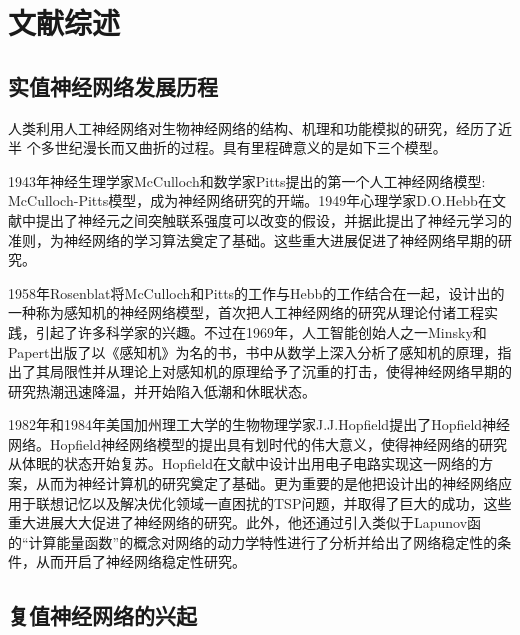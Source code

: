 \documentclass{hitszthesis}
\begin{document}
\chapter{文献综述}

\section{实值神经网络发展历程}


人类利用人工神经网络对生物神经网络的结构、机理和功能模拟的研究，经历了近半
个多世纪漫长而又曲折的过程。具有里程碑意义的是如下三个模型。

1943年神经生理学家McCulloch和数学家Pitts提出的第一个人工神经网络模型:
McCulloch-Pitts模型，成为神经网络研究的开端。1949年心理学家D.O.Hebb在文献中提出了神经元之间突触联系强度可以改变的假设，并据此提出了神经元学习的准则，为神经网络的学习算法奠定了基础。这些重大进展促进了神经网络早期的研究。

1958年Rosenblat将McCulloch和Pitts的工作与Hebb的工作结合在一起，设计出的
一种称为感知机的神经网络模型，首次把人工神经网络的研究从理论付诸工程实践，引起了许多科学家的兴趣。不过在1969年，人工智能创始人之一Minsky和Papert出版了以《感知机》为名的书，书中从数学上深入分析了感知机的原理，指出了其局限性并从理论上对感知机的原理给予了沉重的打击，使得神经网络早期的研究热潮迅速降温，并开始陷入低潮和休眠状态。

1982年和1984年美国加州理工大学的生物物理学家J.J.Hopf\/ield提出了Hopf\/ield神经网络。Hopf\/ield神经网络模型的提出具有划时代的伟大意义，使得神经网络的研究从体眠的状态开始复苏。Hopf\/ield在文献\cite{bibc7,bibc8}中设计出用电子电路实现这一网络的方案，从而为神经计算机的研究奠定了基础。更为重要的是他把设计出的神经网络应用于联想记忆以及解决优化领域一直困扰的TSP问题，并取得了巨大的成功，这些重大进展大大促进了神经网络的研究。此外，他还通过引入类似于Lapunov函的“计算能量函数”的概念对网络的动力学特性进行了分析并给出了网络稳定性的条件，从而开启了神经网络稳定性研究。

\section{复值神经网络的兴起}
\end{document}
